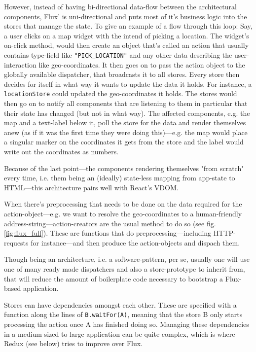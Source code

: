 However, instead of having bi-directional data-flow between the architectural components, Flux' is uni-directional and puts most of it's business logic into the stores that manage the state. To give an example of a flow through this loop: Say, a user clicks on a map widget with the intend of picking a location. The widget's on-click method, would then create an object that's called an action that usually contains type-field like \texttt{"PICK\_LOCATION"} and any other data describing the
user-interaction like geo-coordinates. It then goes on to pass the action object to the globally available dispatcher, that broadcasts it to all stores. Every store then decides for itself in what way it wants to update the data it holds. For instance, a \texttt{locationStore} could updated the geo-coordinates it holds. The stores would then go on to notify all components that are listening to them in particular that their state has changed (but not in what way). The affected
components, e.g. the map and a text-label below it, poll the store for the data and render themselves anew (as if it was the first time they were doing this)---e.g. the map would place a singular marker on the coordinates it gets from the store and the label would write out the coordinates as numbers.

Because of the last point---the components rendering themselves "from scratch" every time, i.e. them being an (ideally) state-less mapping from app-state to HTML---this architecture pairs well with React's VDOM.

When there's preprocessing that needs to be done on the data required for the action-object---e.g. we want to resolve the geo-coordinates to a human-friendly address-string---action-creators are the usual method to do so (see fig. \ref{fig:flux_full}). These are functions that do preprocessing---including HTTP-requests for instance---and then produce the action-objects and dispach them. 

Though being an architecture, i.e. a software-pattern,  per se, usually one will use one of many ready made dispatchers and also a store-prototype to inherit from, that will reduce the amount of boilerplate code necessary to bootstrap a Flux-based application.

Stores can have dependencies amongst each other. These are specified with a function along the lines of \texttt{B.waitFor(A)}, meaning that the store B only starts processing the action once A has finished doing so. Managing these dependencies in a medium-sized to large application can be quite complex, which is where Redux (see below) tries to improve over Flux.

